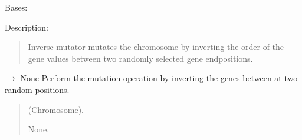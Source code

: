 \documentclass[letterpaper,10pt,english]{sphinxmanual}
\begin{document}
\begin{fulllineitems}
\label{\detokenize{pygenalgo.operators.mutation:pygenalgo.operators.mutation.inverse_mutator.InverseMutator}}
\pysigstartsignatures
\pysiglinewithargsret
{}
{}
{}
\pysigstopsignatures
\sphinxAtStartPar
Bases: {\hyperref[\detokenize{pygenalgo.operators.mutation:pygenalgo.operators.mutation.mutate_operator.MutationOperator}]{}}

\sphinxAtStartPar
Description:
\begin{quote}

\sphinxAtStartPar
Inverse mutator mutates the chromosome by inverting the order of
the gene values between two randomly selected gene end\sphinxhyphen{}positions.
\end{quote}

\begin{fulllineitems}
\label{\detokenize{pygenalgo.operators.mutation:pygenalgo.operators.mutation.inverse_mutator.InverseMutator.mutate}}
\pysigstartsignatures
\pysiglinewithargsret
{}
{}
{{ $\rightarrow$ None}}
\pysigstopsignatures
\sphinxAtStartPar
Perform the mutation operation by inverting the genes
between at two random positions.
\begin{quote}\begin{description}
\sphinxAtStartPar
{} \textendash{} (Chromosome).

\sphinxAtStartPar
None.

\end{description}\end{quote}

\end{fulllineitems}


\end{fulllineitems}
\end{document}
